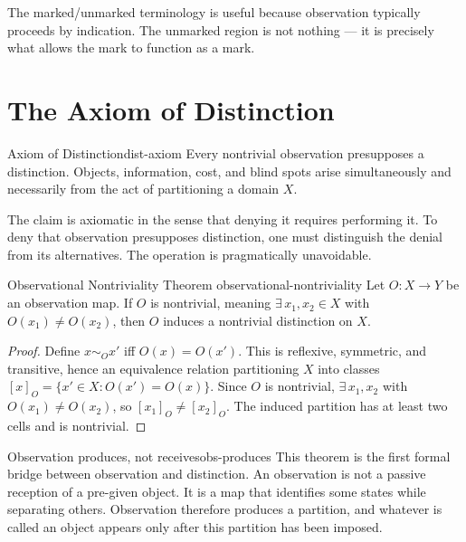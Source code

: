 \documentclass[12pt,twoside,openright]{book}
\begin{document}
The marked/unmarked terminology is useful because
observation typically proceeds by indication. The unmarked
region is not nothing — it is precisely what allows the
mark to function as a mark.

\section{The Axiom of Distinction}
\label{sec:ch1-axiom}

\begin{axiom}{Axiom of Distinction}{dist-axiom}
  Every nontrivial observation presupposes a distinction.
  Objects, information, cost, and blind spots arise
  simultaneously and necessarily from the act of
  partitioning a domain $X$.
\end{axiom}

The claim is axiomatic in the sense that denying it
requires performing it. To deny that observation
presupposes distinction, one must distinguish the denial
from its alternatives. The operation is pragmatically
unavoidable.

\begin{theorem}{Observational Nontriviality Theorem}%
  {observational-nontriviality}
  Let $O: X \to Y$ be an observation map. If $O$ is
  nontrivial, meaning $\exists\, x_1, x_2 \in X$ with
  $O(x_1) \ne O(x_2)$, then $O$ induces a nontrivial
  distinction on $X$.
\end{theorem}

\begin{proof}
  Define $x \sim_O x'$ iff $O(x) = O(x')$. This is
  reflexive, symmetric, and transitive, hence an
  equivalence relation partitioning $X$ into classes
  $[x]_O = \{x' \in X : O(x') = O(x)\}$.
  Since $O$ is nontrivial, $\exists\, x_1, x_2$ with
  $O(x_1) \ne O(x_2)$, so $[x_1]_O \ne [x_2]_O$.
  The induced partition has at least two cells and is
  nontrivial.
\end{proof}

\begin{remark}{Observation produces, not receives}{obs-produces}
  This theorem is the first formal bridge between
  observation and distinction. An observation is not a
  passive reception of a pre-given object. It is a map
  that identifies some states while separating others.
  Observation therefore produces a partition, and whatever
  is called an object appears only after this partition
  has been imposed.
\end{remark}
\end{document}
